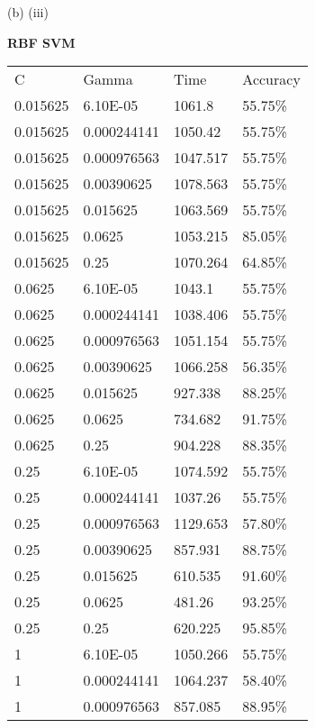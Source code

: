 \documentclass[12pt]{article}
\newenvironment{problem}[2][Problem]{\begin{trivlist}
\item[\hskip \labelsep {\bfseries #1}\hskip \labelsep {\bfseries #2.}]}{\end{trivlist}}
\begin{document}
\clearpage

\begin{problem} 6 (b) (iii)
\end{problem}
\begin{Answer}
\textbf{RBF SVM}\\ 
\begin{table}[]
\begin{tabular}{llll}
C        & Gamma       & Time     & Accuracy \\
0.015625 & 6.10E-05    & 1061.8   & 55.75\%  \\
0.015625 & 0.000244141 & 1050.42  & 55.75\%  \\
0.015625 & 0.000976563 & 1047.517 & 55.75\%  \\
0.015625 & 0.00390625  & 1078.563 & 55.75\%  \\
0.015625 & 0.015625    & 1063.569 & 55.75\%  \\
0.015625 & 0.0625      & 1053.215 & 85.05\%  \\
0.015625 & 0.25        & 1070.264 & 64.85\%  \\
0.0625   & 6.10E-05    & 1043.1   & 55.75\%  \\
0.0625   & 0.000244141 & 1038.406 & 55.75\%  \\
0.0625   & 0.000976563 & 1051.154 & 55.75\%  \\
0.0625   & 0.00390625  & 1066.258 & 56.35\%  \\
0.0625   & 0.015625    & 927.338  & 88.25\%  \\
0.0625   & 0.0625      & 734.682  & 91.75\%  \\
0.0625   & 0.25        & 904.228  & 88.35\%  \\
0.25     & 6.10E-05    & 1074.592 & 55.75\%  \\
0.25     & 0.000244141 & 1037.26  & 55.75\%  \\
0.25     & 0.000976563 & 1129.653 & 57.80\%  \\
0.25     & 0.00390625  & 857.931  & 88.75\%  \\
0.25     & 0.015625    & 610.535  & 91.60\%  \\
0.25     & 0.0625      & 481.26   & 93.25\%  \\
0.25     & 0.25        & 620.225  & 95.85\%  \\
1        & 6.10E-05    & 1050.266 & 55.75\%  \\
1        & 0.000244141 & 1064.237 & 58.40\%  \\
1        & 0.000976563 & 857.085  & 88.95\%  \\

\end{tabular}
\end{table}
\end{Answer}
\end{document}
